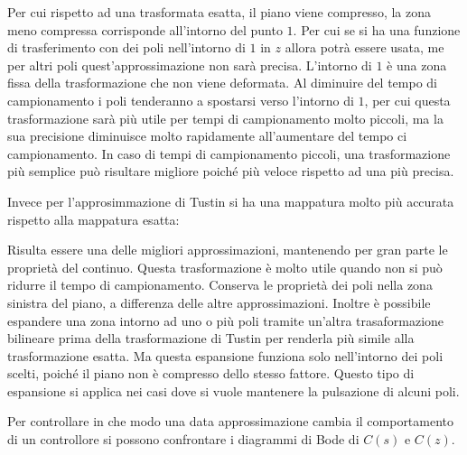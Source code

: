 \documentclass{article}
\numberwithin{equation}{subsection}
\begin{document}
Per cui rispetto ad una trasformata esatta, il piano viene compresso, la zona meno compressa corrisponde all'intorno del punto $1$. Per cui se si ha una 
funzione di trasferimento con dei poli nell'intorno di $1$ in $z$ allora potrà essere usata, me per altri poli quest'approssimazione non sarà precisa. 
L'intorno di $1$ è una zona fissa della trasformazione che non viene deformata. Al diminuire del tempo di campionamento i poli tenderanno a spostarsi verso l'intorno di $1$, 
per cui questa trasformazione sarà più utile per tempi di campionamento molto piccoli, ma la sua precisione diminuisce molto rapidamente all'aumentare del tempo ci campionamento. 
In caso di tempi di campionamento piccoli, una trasformazione più semplice può risultare migliore poiché più veloce rispetto ad una più precisa. 

Invece per l'approsimmazione di Tustin si ha una mappatura molto più accurata rispetto alla mappatura esatta:
\begin{center}
\end{center}
Risulta essere una delle migliori approssimazioni, mantenendo per gran parte le proprietà del continuo. Questa trasformazione è molto utile quando non si può ridurre il 
tempo di campionamento. Conserva le proprietà dei poli nella zona sinistra del piano, a differenza delle altre approssimazioni. Inoltre è possibile espandere una zona 
intorno ad uno o più poli tramite un'altra trasaformazione bilineare prima della trasformazione di Tustin per renderla più simile alla trasformazione esatta. Ma questa 
espansione funziona solo nell'intorno dei poli scelti, poiché il piano non è compresso dello stesso fattore. Questo tipo di espansione si applica nei casi dove si 
vuole mantenere la pulsazione di alcuni poli. 

Per controllare in che modo una data approssimazione cambia il comportamento di un controllore si possono confrontare i diagrammi di Bode di $C(s)$ e $C(z)$. 
\end{document}
